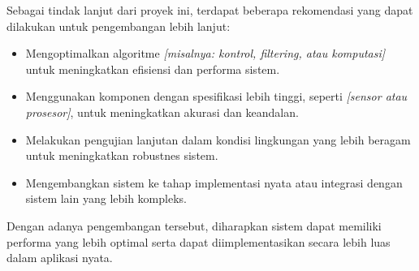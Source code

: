 Sebagai tindak lanjut dari proyek ini, terdapat beberapa rekomendasi yang dapat dilakukan untuk pengembangan lebih lanjut:

\begin{itemize}
    \item Mengoptimalkan algoritme \textit{[misalnya: kontrol, filtering, atau komputasi]} untuk meningkatkan efisiensi dan performa sistem.
    \item Menggunakan komponen dengan spesifikasi lebih tinggi, seperti \textit{[sensor atau prosesor]}, untuk meningkatkan akurasi dan keandalan.
    \item Melakukan pengujian lanjutan dalam kondisi lingkungan yang lebih beragam untuk meningkatkan robustnes sistem.
    \item Mengembangkan sistem ke tahap implementasi nyata atau integrasi dengan sistem lain yang lebih kompleks.
\end{itemize}

Dengan adanya pengembangan tersebut, diharapkan sistem dapat memiliki performa yang lebih optimal serta dapat diimplementasikan secara lebih luas dalam aplikasi nyata.